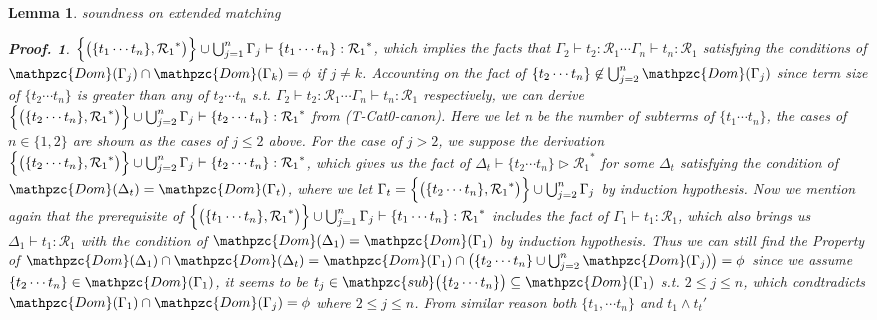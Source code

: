\documentclass[12pt]{article}
\newtheorem{Lemma}{Lemma}[section]
\newtheorem{Proof}{Proof.}
\begin{document}
\begin{Lemma}{soundness on extended matching}
\begin{Proof}
    $\Bigl\{\bigl(\{t_1 \cdots t_n\}, {\mathcal{R}_1}^* \bigr) \Bigr\} \cup
    \bigcup_{j=1}^n\Gamma_j \vdash \{t_1 \cdots t_n\}: {\mathcal{R}_1}^*$,
    which implies the facts that
    $\Gamma_2 \vdash t_2 : \mathcal{R}_1 \cdots
    \Gamma_n \vdash t_n: \mathcal{R}_1$ satisfying the conditions of
    $\mathpzc{Dom}(\Gamma_j) \cap \mathpzc{Dom}(\Gamma_k) = \phi$ if
    $j \neq k$. Accounting on the fact of
    $\{t_2 \cdots t_n\} \not\in \bigcup_{j=2}^n\mathpzc{Dom}(\Gamma_j)$
    since term size of $\{t_2 \cdots t_n\}$ is greater than any of
    $t_2 \cdots t_n$ s.t. $\Gamma_2 \vdash t_2: \mathcal{R}_1 \cdots
    \Gamma_n \vdash t_n: \mathcal{R}_1$ respectively, we can derive
    $\Bigl\{\bigl(\{t_2 \cdots t_n\}, {\mathcal{R}_1}^* \bigr) \Bigr\} \cup
    \bigcup_{j=2}^n\Gamma_j \vdash \{t_2 \cdots t_n\}: {\mathcal{R}_1}^*$
    from (T-Cat0-canon). Here we let n be the number of subterms of
    $\{t_1 \cdots t_n\}$, the cases of $n \in \{1, 2\}$ are shown as the
    cases of $j \le 2$ above.
    For the case of $j > 2$, we suppose the derivation
    $\Bigl\{\bigl(\{t_2 \cdots t_n\}, {\mathcal{R}_1}^* \bigr) \Bigr\} \cup
    \bigcup_{j=2}^n\Gamma_j \vdash \{t_2 \cdots t_n\}: {\mathcal{R}_1}^*$,
    which gives us the fact of
    $\Delta_t \vdash \{t_2 \cdots t_n\} \triangleright {\mathcal{R}_1}^*$
    for some $\Delta_t$ satisfying the condition of
    $\mathpzc{Dom}(\Delta_t) = \mathpzc{Dom}(\Gamma_t)$, where we let
    $\Gamma_t = \Bigl\{\bigl(\{t_2 \cdots t_n\}, {\mathcal{R}_1}^* \bigr)
    \Bigr\} \cup \bigcup_{j=2}^n\Gamma_j$ by induction hypothesis. Now
    we mention again that the prerequisite of
    $\Bigl\{\bigl(\{t_1 \cdots t_n\}, {\mathcal{R}_1}^* \bigr) \Bigr\} \cup
    \bigcup_{j=1}^n\Gamma_j  \vdash \{t_1 \cdots t_n\}: {\mathcal{R}_1}^*$
    includes the fact of $\Gamma_1 \vdash t_1 : \mathcal{R}_1$, 
    which also brings us $\Delta_1 \vdash t_1 : \mathcal{R}_1$ with
    the condition of
    $\mathpzc{Dom}(\Delta_1) = \mathpzc{Dom}(\Gamma_1)$ by
    induction hypothesis. Thus we can still find the Property of
    $\mathpzc{Dom}(\Delta_1) \cap \mathpzc{Dom}(\Delta_t) =
    \mathpzc{Dom}(\Gamma_1) \cap
    \bigl(\{t_2 \cdots t_n\} \cup \bigcup_{j=2}^n\mathpzc{Dom}(\Gamma_j)
    \bigr) = \phi$ since we assume
    $\{t_2 \cdots t_n\} \in \mathpzc{Dom}(\Gamma_1)$, it seems to be
    $t_j \in \mathpzc{sub}\bigl(\{t_2 \cdots t_n\} \bigr) \subseteq
    \mathpzc{Dom}(\Gamma_1)$ s.t. $2 \le j \le n$, which condtradicts
    $\mathpzc{Dom}(\Gamma_1) \cap \mathpzc{Dom}(\Gamma_j) = \phi$ where
    $2 \le j \le n$.
    From similar reason both $\{t_1, \cdots t_n\}$ and $t_1 \wedge t_t'$

\end{Proof}
\end{Lemma}
\end{document}
